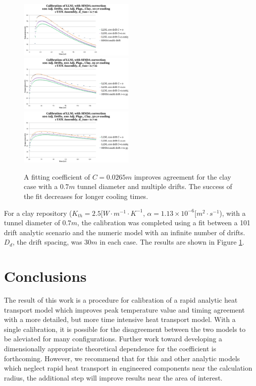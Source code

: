 \documentclass{article}
\begin{document}
\begin{figure}[h!]
  \centering
    \includegraphics[width=0.5\textwidth]{100drift10yr.eps}
    \includegraphics[width=0.5\textwidth]{100drift25yr.eps}
    \includegraphics[width=0.5\textwidth]{100drift50yr.eps}
  \caption{A fitting coefficient of $C=0.0265m$ improves agreement for the clay 
  case with a $0.7m$ tunnel diameter and multiple drifts. The success of the fit 
  decreases for longer cooling times.}
  \label{fig:fit}
\end{figure}

For a clay repository ($K_{th} = 2.5 [W\cdot m^{-1}\cdot K^{-1}$, $\alpha = 
1.13\times10^{-6}[m^2\cdot s^{-1}$), with a tunnel diameter of $0.7m$, the 
calibration was completed using a fit between a 101 drift analytic scenario 
and the numeric model with an infinite number of drifts. $D_{d}$, the drift 
spacing, was $30m$ in each case. The results are shown in Figure \ref{fig:fit}.

\section{Conclusions}

The result of this work is a procedure for calibration of a rapid analytic 
heat transport model which improves peak temperature value and timing agreement 
with a more detailed, but more time intensive heat transport model. With a 
single calibration, it is possible for the disagreement between the two models to 
be aleviated for many configurations. Further work toward developing a 
dimensionally appropriate theoretical dependence for the coefficient is 
forthcoming. However, we recommend that for this and other 
analytic models which neglect rapid heat transport in engineered components 
near the calculation radius, the additional step will improve results near the 
area of interest.
\end{document}
